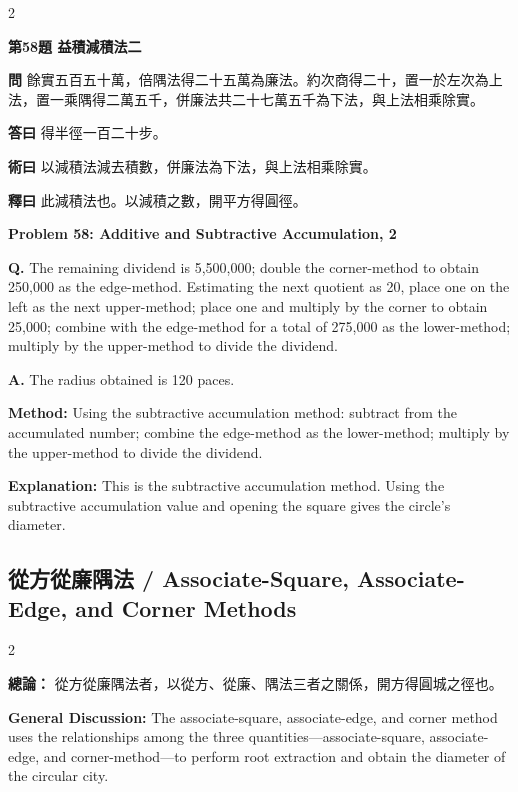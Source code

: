 \documentclass[11pt,a4paper]{article}
\newcommand{\wen}[1]{\noindent\textbf{問} #1\par\smallskip}
\newcommand{\da}[1]{\noindent\textbf{答曰} #1\par\smallskip}
\newcommand{\shu}[1]{\noindent\textbf{術曰} #1\par\smallskip}
\newcommand{\shi}[1]{\noindent\textbf{釋曰} #1\par\smallskip}
\newcommand{\wenE}[1]{\noindent\textbf{Q.} #1\par\smallskip}
\newcommand{\daE}[1]{\noindent\textbf{A.} #1\par\smallskip}
\newcommand{\shuE}[1]{\noindent\textbf{Method:} #1\par\smallskip}
\newcommand{\shiE}[1]{\noindent\textbf{Explanation:} #1\par\smallskip}
\begin{document}
\bigskip

\begin{paracol}{2}

\noindent\textbf{第58題 益積減積法二}

\wen{餘實五百五十萬，倍隅法得二十五萬為廉法。約次商得二十，置一於左次為上法，置一乘隅得二萬五千，併廉法共二十七萬五千為下法，與上法相乘除實。}
\da{得半徑一百二十步。}
\shu{以減積法減去積數，併廉法為下法，與上法相乘除實。}
\shi{此減積法也。以減積之數，開平方得圓徑。}

\switchcolumn

\noindent\textbf{Problem 58: Additive and Subtractive Accumulation, 2}

\wenE{The remaining dividend is 5,500,000; double the corner-method to obtain 250,000 as the edge-method. Estimating the next quotient as 20, place one on the left as the next upper-method; place one and multiply by the corner to obtain 25,000; combine with the edge-method for a total of 275,000 as the lower-method; multiply by the upper-method to divide the dividend.}
\daE{The radius obtained is 120 paces.}
\shuE{Using the subtractive accumulation method: subtract from the accumulated number; combine the edge-method as the lower-method; multiply by the upper-method to divide the dividend.}
\shiE{This is the subtractive accumulation method. Using the subtractive accumulation value and opening the square gives the circle's diameter.}

\end{paracol}

\clearpage

\subsection*{從方從廉隅法 / Associate-Square, Associate-Edge, and Corner Methods}

\begin{paracol}{2}

\noindent\textbf{總論：} 從方從廉隅法者，以從方、從廉、隅法三者之關係，開方得圓城之徑也。

\switchcolumn

\noindent\textbf{General Discussion:} The associate-square, associate-edge, and corner method uses the relationships among the three quantities---associate-square, associate-edge, and corner-method---to perform root extraction and obtain the diameter of the circular city.

\end{paracol}
\end{document}
